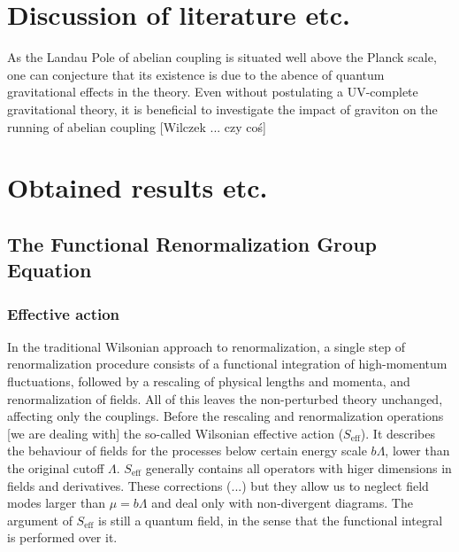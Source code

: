 \documentclass[11pt, a4paper]{article}
\begin{document}

\section{Discussion of literature etc.}

As the Landau Pole of abelian coupling is situated well above the Planck scale, one can conjecture that
its existence is due to the abence of quantum gravitational effects in the theory.
Even without postulating a UV-complete gravitational theory, it is beneficial to investigate
the impact of graviton on the running of abelian coupling [Wilczek ... czy coś]



\section{Obtained results etc.}


\subsection{The Functional Renormalization Group Equation}

\subsubsection*{\centering Effective action}

In the traditional Wilsonian approach to renormalization, a single step of renormalization procedure consists of
a functional integration of high-momentum fluctuations, followed by a rescaling of physical lengths and momenta, and
renormalization of fields. All of this leaves the non-perturbed theory unchanged, affecting only the couplings.
Before the rescaling and renormalization operations [we are dealing with] the so-called Wilsonian effective action ($S_{\text{eff}}$).
It describes the behaviour of fields for the processes below certain energy scale $b\Lambda$, lower than the original cutoff $\Lambda$.
$S_{\text{eff}}$ generally contains all operators with higer dimensions in fields and derivatives.
These corrections (...) but they allow us to neglect field modes larger than $\mu = b\Lambda$ and deal only with non-divergent diagrams.
The argument of $S_{\text{eff}}$ is still a quantum field, in the sense that the functional integral is performed over it. %
\end{document}
